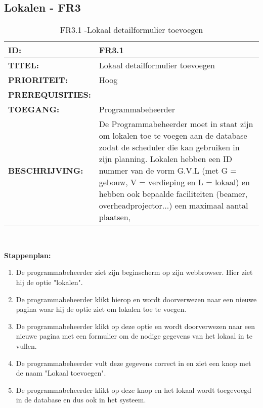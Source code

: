 \subsection{Lokalen - FR3}

\noindent\begin{table}[H]
            \begin{tabular}{l | p{10cm}}
                \textbf{ID:} & FR3.1 \\ \hline
                \textbf{TITEL:} & Lokaal detailformulier toevoegen\\ \hline
                \textbf{PRIORITEIT:} &  Hoog \\ \hline
                \textbf{PREREQUISITIES:} & \\ \hline
                \textbf{TOEGANG:} & Programmabeheerder \\ \hline
                \textbf{BESCHRIJVING:} & De Programmabeheerder moet in staat zijn om lokalen toe te voegen aan de database zodat de scheduler die kan gebruiken in zijn planning. Lokalen hebben een ID nummer van de vorm G.V.L (met G = gebouw, V = verdieping en L = lokaal) en hebben ook bepaalde faciliteiten (beamer, overheadprojector...) een maximaal aantal plaatsen, \\ 
            \end{tabular}\\
            \caption{FR3.1 -Lokaal detailformulier toevoegen}
            \label{tab:FR3.1 - Lokaal detailformulier toevoegen}
        \end{table}

\textbf{Stappenplan:}
\begin{enumerate}
\item De programmabeheerder ziet zijn beginscherm op zijn webbrowser. Hier ziet hij de optie "lokalen".
\item De programmabeheerder klikt hierop en wordt doorverwezen naar een nieuwe pagina waar hij de optie ziet om lokalen toe te voegen.
\item De programmabeheerder klikt op deze optie en wordt doorverwezen naar een nieuwe pagina met een formulier om de nodige gegevens van het lokaal in te vullen.
\item De programmabeheerder vult deze gegevens correct in en ziet een knop met de naam "Lokaal toevoegen".
\item De programmabeheerder klikt op deze knop en het lokaal wordt toegevoegd in de database en dus ook in het systeem.
\end{enumerate}

